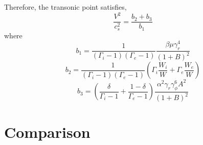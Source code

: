 \documentclass[12pt]{book}
\begin{document}
Therefore, the transonic point satisfies,
\begin{equation}
\frac{V^2}{c_s^2}=\frac{b_2+b_3}{b_1}
\end{equation}
where
\begin{equation}
 b_1=\frac{1}{(\Gamma_i-1)(\Gamma_e-1)}\frac{\beta\mu\gamma_r^4}{(1+B)^2}
\end{equation}
\begin{equation}
 b_2=\frac{1}{(\Gamma_i-1)(\Gamma_e-1)}\left(\Gamma_i\frac{W_i}{W}+\Gamma_e\frac{W_e}{W}\right)
\end{equation}
\begin{equation}
b_3=\left(\frac{\delta}{\Gamma_i-1}+\frac{1-\delta}{\Gamma_e-1}\right)\frac{\alpha^2\gamma_r\gamma_\phi^6A^2}{(1+B)^2}
\end{equation}
\section{Comparison}
\end{document}

